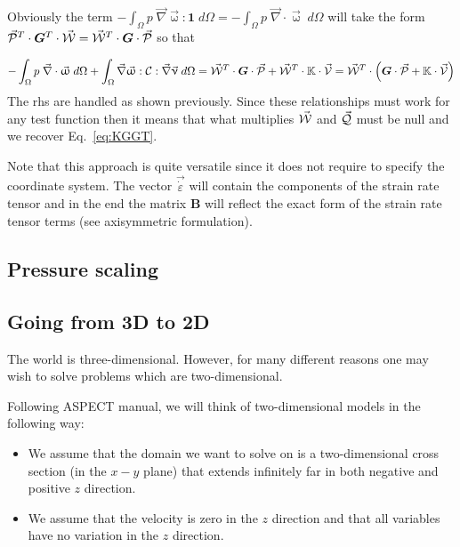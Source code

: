 Obviously the term 
$- \int_\Omega p \; \vec\nabla  \vec{\upomega} : {\bm 1}  \; d\Omega 
=- \int_\Omega p \; \vec\nabla \cdot \vec{\upomega}   \; d\Omega $
will take the form
$\vec{\cal P}^T \cdot {\bm G}^T \cdot \vec{\cal W} = 
\vec{\cal W}^T \cdot {\bm G} \cdot \vec{\cal P} $
so that 

\[
- \int_\Omega p \; \vec\nabla\cdot  \vec{\upomega}   \; d\Omega 
+ \int_\Omega \vec\nabla \vec{\upomega} : {\cal C} : \vec\nabla \vec\upnu\; d\Omega 
=
\vec{\cal W}^T \cdot {\bm G} \cdot \vec{\cal P} 
+
\vec{\cal W}^T \cdot \mathbb{K} \cdot \vec{\cal V} 
=
\vec{\cal W}^T \cdot \left( {\bm G} \cdot \vec{\cal P} + \mathbb{K} \cdot \vec{\cal V} \right)
\]
The rhs are handled as shown previously. 
Since these relationships must work for any test function then
it means that what multiplies $\vec{\cal W}$ and $\vec{\cal Q}$ must be null
and we recover Eq.~\eqref{eq:KGGT}.

Note that this approach is quite versatile since it does not require to specify the 
coordinate system. The vector $\vec{\dot \varepsilon}$ will contain the components of the 
strain rate tensor and in the end the matrix ${\bm B}$ will reflect the exact 
form of the strain rate tensor terms (see axisymmetric formulation).


\subsection{Pressure scaling \label{pscaling}} 







\subsection{Going from 3D to 2D}

The world is three-dimensional. However, for many different reasons one may wish to solve problems
which are two-dimensional. 

Following ASPECT manual, we  will think of two-dimensional models in the following way: 
\begin{itemize}
\item We assume that the domain we want to solve on is a two-dimensional cross section (in the $x-y$ plane) 
that extends infinitely far in both negative and positive $z$ direction.  
\item We assume that the velocity is zero in the $z$ direction and that all variables 
have no variation in the $z$ direction. 
\end{itemize}

